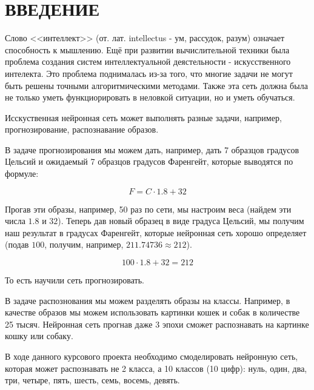 \section*{ВВЕДЕНИЕ} %

Слово <<интеллект>> (от. лат. intellectus - ум, рассудок, разум)
означает способность к мышлению.
Ещё при развитии вычислительной техники была проблема создания систем
интеллектуальной деястельности - искусственного интелекта.
Это проблема поднималась из-за того,
что многие задачи не могут быть решены точными алгоритмическими методами.
Также эта сеть должна была не только уметь функциорировать в неловкой ситуации,
но и уметь обучаться.

Исскуственная нейронная сеть может выполнять разные задачи,
например, прогнозирование, распознавание образов.

В задаче прогнозирования мы можем дать,
например, дать 7 образцов градусов Цельсий
и ожидаемый 7 образцов градусов Фаренгейт,
которые выводятся по формуле:

$$F = C \cdot 1.8 + 32$$

Прогав эти образы, например, 50 раз по сети,
мы настроим веса (найдем эти числа $1.8$ и $32$).
Теперь дав новый образец в виде градуса Цельсий,
мы получим наш результат в градусах Фаренгейт,
которые нейронная сеть хорошо определяет
(подав $100$, получим, например, $211.74736 \approx 212$).

$$100 \cdot 1.8 + 32 = 212$$

То есть научили сеть прогнозировать.

В задаче распознования мы можем разделять образы на классы.
Например, в качестве образов мы можем использовать картинки кошек и собак в количестве 25 тысяч.
Нейронная сеть прогнав даже 3 эпохи сможет распознавать на картинке кошку или собаку.

В ходе данного курсового проекта необходимо смоделировать нейронную сеть,
которая может распознавать не 2 класса,
а 10 классов (10 цифр):
нуль, один, два, три, четыре, пять, шесть, семь, восемь, девять.

